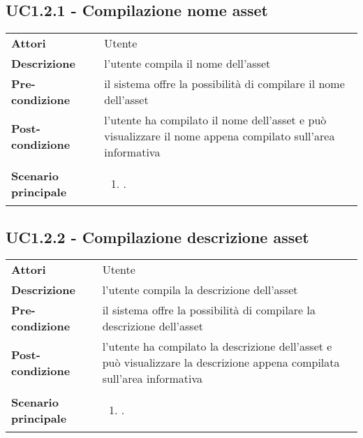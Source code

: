 \subsection{UC1.2.1 - Compilazione nome asset} 
\label{sssec:UC1.2.1} 
\def\arraystretch{1.5}
\begin{tabularx}{\textwidth}{l|p{}}
	\rowcolor{I} \multicolumn{2}{c}{\color{white}\textbf{UC1.2.1 - Compilazione nome asset}} \\
	\toprule
	\endhead
	\textbf{Attori} & Utente\\
	\textbf{Descrizione} & l'utente compila il nome dell'asset\\
	\textbf{Pre-condizione} & il sistema offre la possibilità di compilare il nome dell'asset\\
	\textbf{Post-condizione} & l'utente ha compilato il nome dell'asset e può visualizzare il nome appena compilato sull'area informativa\\
	\textbf{Scenario principale} & \vspace{-1.2em}\begin{enumerate}[leftmargin=*,noitemsep,nosep]
		\item \nameref{sssec:UC1.2.1}.
	\end{enumerate}\\
	\bottomrule
\end{tabularx}
\subsection{UC1.2.2 - Compilazione descrizione asset} 
\label{sssec:UC1.2.2} 
\def\arraystretch{1.5}
\begin{tabularx}{\textwidth}{l|p{}}
	\rowcolor{I} \multicolumn{2}{c}{\color{white}\textbf{UC1.2.2 - Compilazione descrizione asset}} \\
	\toprule
	\endhead
	\textbf{Attori} & Utente\\
	\textbf{Descrizione} & l'utente compila la descrizione dell'asset\\
	\textbf{Pre-condizione} & il sistema offre la possibilità di compilare la descrizione dell'asset\\
	\textbf{Post-condizione} & l'utente ha compilato la descrizione dell'asset e può visualizzare la descrizione appena compilata sull'area informativa\\
	\textbf{Scenario principale} & \vspace{-1.2em}\begin{enumerate}[leftmargin=*,noitemsep,nosep]
		\item \nameref{sssec:UC1.2.2}.
	\end{enumerate}\\
	\bottomrule
\end{tabularx}
